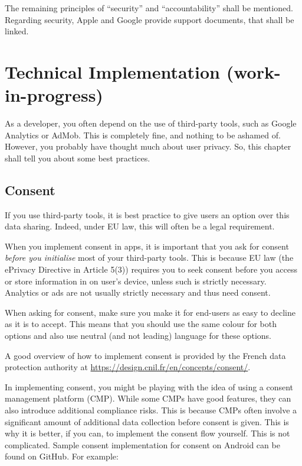\documentclass[
]{book}
\begin{document}
The remaining principles of ``security'' and ``accountability'' shall be mentioned. Regarding security, Apple and Google provide support documents, that shall be linked.

\hypertarget{technical-implementation-work-in-progress}{%
\chapter{Technical Implementation (work-in-progress)}\label{technical-implementation-work-in-progress}}

As a developer, you often depend on the use of third-party tools, such as Google Analytics or AdMob. This is completely fine, and nothing to be ashamed of. However, you probably have thought much about user privacy. So, this chapter shall tell you about some best practices.

\hypertarget{consent}{%
\section{Consent}\label{consent}}

If you use third-party tools, it is best practice to give users an option over this data sharing. Indeed, under EU law, this will often be a legal requirement.

When you implement consent in apps, it is important that you ask for consent \emph{before you initialise} most of your third-party tools. This is because EU law (the ePrivacy Directive in Article 5(3)) requires you to seek consent before you access or store information in on user's device, unless such is strictly necessary. Analytics or ads are not usually strictly necessary and thus need consent.

When asking for consent, make sure you make it for end-users as easy to decline as it is to accept. This means that you should use the same colour for both options and also use neutral (and not leading) language for these options.

A good overview of how to implement consent is provided by the French data protection authority at \url{https://design.cnil.fr/en/concepts/consent/}.

In implementing consent, you might be playing with the idea of using a consent management platform (CMP). While some CMPs have good features, they can also introduce additional compliance risks. This is because CMPs often involve a significant amount of additional data collection before consent is given. This is why it is better, if you can, to implement the consent flow yourself. This is not complicated. Sample consent implementation for consent on Android can be found on GitHub. For example:
\end{document}
